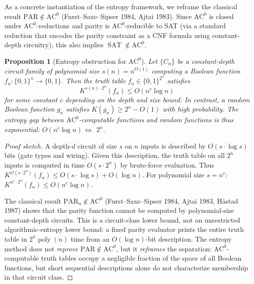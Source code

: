 \documentclass[aps,prd,twocolumn,superscriptaddress,nofootinbib]{revtex4-2}
\newtheorem{proposition}[theorem]{Proposition}
\theoremstyle{definition}
\theoremstyle{remark}
\DeclareMathOperator{\poly}{poly}
\DeclareMathOperator{\SAT}{SAT}
\begin{document}
As a concrete instantiation of the entropy framework, we reframe the classical result $\mathrm{PAR} \notin \mathrm{AC}^0$ (Furst--Saxe--Sipser 1984, Ajtai 1983). Since $\mathrm{AC}^0$ is closed under $\mathrm{AC}^0$-reductions and parity is $\mathrm{AC}^0$-reducible to SAT (via a standard reduction that encodes the parity constraint as a CNF formula using constant-depth circuitry), this also implies $\SAT \notin \mathrm{AC}^0$.

\begin{proposition}[Entropy obstruction for $\mathrm{AC}^0$]
\label{prop:ac0}
Let $\{C_n\}$ be a constant-depth circuit family of polynomial size $s(n) = n^{O(1)}$ computing a Boolean function $f_n: \{0,1\}^n \to \{0,1\}$. Then the truth table $f_n \in \{0,1\}^{2^n}$ satisfies
\begin{equation}
K^{s(n) \cdot 2^n}(f_n) \leq O(n^c \log n)
\end{equation}
for some constant $c$ depending on the depth and size bound. In contrast, a \textit{random} Boolean function $g_n$ satisfies $K(g_n) \geq 2^n - O(1)$ with high probability. The entropy gap between $\mathrm{AC}^0$-computable functions and random functions is thus exponential: $O(n^c \log n)$ vs.\ $2^n$.
\end{proposition}

\begin{proof}[Proof sketch]
A depth-$d$ circuit of size $s$ on $n$ inputs is described by $O(s \cdot \log s)$ bits (gate types and wiring). Given this description, the truth table on all $2^n$ inputs is computed in time $O(s \cdot 2^n)$ by brute-force evaluation. Thus $K^{O(s \cdot 2^n)}(f_n) \leq O(s \cdot \log s) + O(\log n)$. For polynomial size $s = n^c$: $K^{n^c \cdot 2^n}(f_n) \leq O(n^c \log n)$.

The classical result $\mathrm{PAR}_n \notin \mathrm{AC}^0$ (Furst--Saxe--Sipser 1984, Ajtai 1983, H\r{a}stad 1987) shows that the parity function cannot be computed by polynomial-size constant-depth circuits. This is a circuit-class lower bound, not an unrestricted algorithmic-entropy
lower bound: a fixed parity evaluator prints the entire truth table
in $2^n\poly(n)$ time from an $O(\log n)$-bit description.
The entropy method does not \textit{reprove} $\mathrm{PAR} \notin \mathrm{AC}^0$, but it \textit{reframes} the separation: $\mathrm{AC}^0$-computable truth tables occupy a negligible fraction of the space of all Boolean functions, but short sequential descriptions alone do not characterize membership in that circuit class.
\end{proof}
\end{document}

